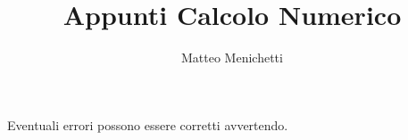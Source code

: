 \documentclass[a4paper,10pt]{article}
\numberwithin{equation}{section}
\theoremstyle{definition}
\begin{document}
\title{Appunti Calcolo Numerico}
\author{Matteo Menichetti}
\maketitle

\noindent Eventuali errori possono essere corretti avvertendo.

\tableofcontents

\clearpage

\printglossary























% 
\end{document}
